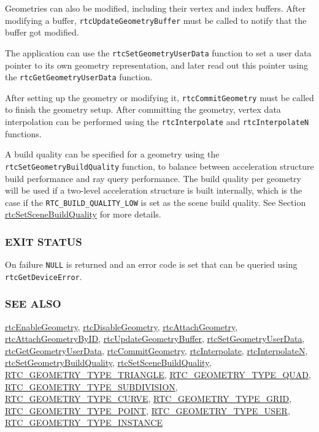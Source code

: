 Geometries can also be modified, including their vertex and index
buffers. After modifying a buffer, \texttt{rtcUpdateGeometryBuffer} must
be called to notify that the buffer got modified.

The application can use the \texttt{rtcSetGeometryUserData} function to
set a user data pointer to its own geometry representation, and later
read out this pointer using the \texttt{rtcGetGeometryUserData}
function.

After setting up the geometry or modifying it,
\texttt{rtcCommitGeometry} must be called to finish the geometry setup.
After committing the geometry, vertex data interpolation can be
performed using the \texttt{rtcInterpolate} and \texttt{rtcInterpolateN}
functions.

A build quality can be specified for a geometry using the
\texttt{rtcSetGeometryBuildQuality} function, to balance between
acceleration structure build performance and ray query performance. The
build quality per geometry will be used if a two-level acceleration
structure is built internally, which is the case if the
\texttt{RTC\_BUILD\_QUALITY\_LOW} is set as the scene build quality. See
Section \hyperref[rtcsetscenebuildquality]{rtcSetSceneBuildQuality} for
more details.

\subsubsection{EXIT STATUS}\label{exit-status}

On failure \texttt{NULL} is returned and an error code is set that can
be queried using \texttt{rtcGetDeviceError}.

\subsubsection{SEE ALSO}\label{see-also}

\hyperref[rtcenablegeometry]{rtcEnableGeometry},
\hyperref[rtcdisablegeometry]{rtcDisableGeometry},
\hyperref[rtcattachgeometry]{rtcAttachGeometry},
\hyperref[rtcattachgeometrybyid]{rtcAttachGeometryByID},
\hyperref[rtcupdategeometrybuffer]{rtcUpdateGeometryBuffer},
\hyperref[rtcsetgeometryuserdata]{rtcSetGeometryUserData},
\hyperref[rtcgetgeometryuserdata]{rtcGetGeometryUserData},
\hyperref[rtccommitgeometry]{rtcCommitGeometry},
\hyperref[rtcinterpolate]{rtcInterpolate},
\hyperref[rtcinterpolaten]{rtcInterpolateN},
\hyperref[rtcsetgeometrybuildquality]{rtcSetGeometryBuildQuality},
\hyperref[rtcsetscenebuildquality]{rtcSetSceneBuildQuality},
\hyperref[rtc_geometry_type_triangle]{RTC\_GEOMETRY\_TYPE\_TRIANGLE},
\hyperref[rtc_geometry_type_quad]{RTC\_GEOMETRY\_TYPE\_QUAD},
\hyperref[rtc_geometry_type_subdivision]{RTC\_GEOMETRY\_TYPE\_SUBDIVISION},
\hyperref[rtc_geometry_type_curve]{RTC\_GEOMETRY\_TYPE\_CURVE},
\hyperref[rtc_geometry_type_grid]{RTC\_GEOMETRY\_TYPE\_GRID},
\hyperref[rtc_geometry_type_point]{RTC\_GEOMETRY\_TYPE\_POINT},
\hyperref[rtc_geometry_type_user]{RTC\_GEOMETRY\_TYPE\_USER},
\hyperref[rtc_geometry_type_instance]{RTC\_GEOMETRY\_TYPE\_INSTANCE}

